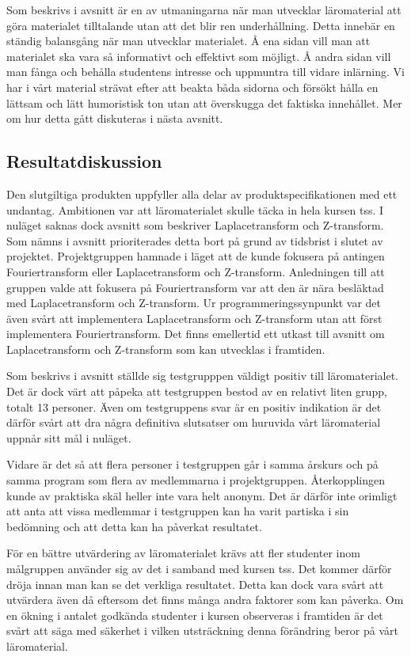 \documentclass[12pt,a4paper,twoside,openright]{article}
\begin{document}
Som beskrivs i avsnitt  är en av utmaningarna
när man utvecklar läromaterial att göra materialet tilltalande utan
att det blir ren underhållning. Detta innebär en ständig balansgång
när man utvecklar materialet. Å ena sidan vill man att materialet ska
vara så informativt och effektivt som möjligt. Å andra sidan vill man
fånga och behålla studentens intresse och uppmuntra till vidare
inlärning. Vi har i vårt material strävat efter att beakta båda
sidorna och försökt hålla en lättsam och lätt humoristisk ton utan att
överskugga det faktiska innehållet. Mer om hur detta gått diskuteras i
nästa avsnitt.

\subsection{Resultatdiskussion}
\label{sec:resDisk}
Den slutgiltiga produkten uppfyller alla delar av
produktspecifikationen med ett undantag. Ambitionen var att
läromaterialet skulle täcka in hela kursen \gls{tss}. I nuläget saknas
dock avsnitt som beskriver Laplacetransform och Z-transform. Som nämns
i avsnitt  prioriterades detta bort på grund
av tidsbrist i slutet av projektet. Projektgruppen hamnade i läget att
de kunde fokusera på antingen Fouriertransform eller Laplacetransform
och Z-transform. Anledningen till att gruppen valde att fokusera på
Fouriertransform var att den är nära besläktad med Laplacetransform
och Z-transform. Ur programmeringssynpunkt var det även svårt att
implementera Laplacetransform och Z-transform utan att först
implementera Fouriertransform. Det finns emellertid ett utkast till
avsnitt om Laplacetransform och Z-transform som kan utvecklas i
framtiden.

Som beskrivs i avsnitt  ställde sig testgrupppen
väldigt positiv till läromaterialet. Det är dock värt att påpeka att
testgruppen bestod av en relativt liten grupp, totalt 13 personer.
Även om testgruppens svar är en positiv indikation är det därför svårt
att dra några definitiva slutsatser om huruvida vårt läromaterial
uppnår sitt mål i nuläget.

Vidare är det så att flera personer i testgruppen går i samma årskurs
och på samma program som flera av medlemmarna i
projektgruppen. Återkopplingen kunde av praktiska skäl heller inte
vara helt anonym. Det är därför inte orimligt att anta att vissa
medlemmar i testgruppen kan ha varit partiska i sin bedömning och att
detta kan ha påverkat resultatet.

För en bättre utvärdering av läromaterialet krävs att fler studenter
inom målgruppen använder sig av det i samband med kursen
\gls{tss}. Det kommer därför dröja innan man kan se det verkliga
resultatet. Detta kan dock vara svårt att utvärdera även då eftersom
det finns många andra faktorer som kan påverka. Om en ökning i antalet
godkända studenter i kursen observeras i framtiden är det svårt att
säga med säkerhet i vilken utsträckning denna förändring beror på vårt
läromaterial.
\end{document}
